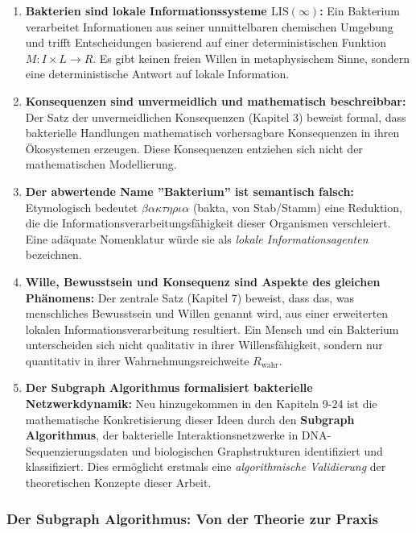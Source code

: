 \documentclass[a4paper,12pt]{article}
\theoremstyle{definition}
\begin{document}
\begin{enumerate}
    \item \textbf{Bakterien sind lokale Informationssysteme $\text{LIS}(\infty)$:}
    Ein Bakterium verarbeitet Informationen aus seiner unmittelbaren chemischen Umgebung und trifft Entscheidungen basierend auf einer deterministischen Funktion $M: I \times L \to R$. Es gibt keinen freien Willen in metaphysischem Sinne, sondern eine deterministische Antwort auf lokale Information.
    
    \item \textbf{Konsequenzen sind unvermeidlich und mathematisch beschreibbar:}
    Der Satz der unvermeidlichen Konsequenzen (Kapitel 3) beweist formal, dass bakterielle Handlungen mathematisch vorhersagbare Konsequenzen in ihren Ökosystemen erzeugen. Diese Konsequenzen entziehen sich nicht der mathematischen Modellierung.
    
    \item \textbf{Der abwertende Name ''Bakterium'' ist semantisch falsch:}
    Etymologisch bedeutet $\beta\alpha\kappa\tau\eta\rho\iota\alpha$ (bakta, von Stab/Stamm) eine Reduktion, die die Informationsverarbeitungsfähigkeit dieser Organismen verschleiert. Eine adäquate Nomenklatur würde sie als \textit{lokale Informationsagenten} bezeichnen.
    
    \item \textbf{Wille, Bewusstsein und Konsequenz sind Aspekte des gleichen Phänomens:}
    Der zentrale Satz (Kapitel 7) beweist, dass das, was menschliches Bewusstsein und Willen genannt wird, aus einer erweiterten lokalen Informationsverarbeitung resultiert. Ein Mensch und ein Bakterium unterscheiden sich nicht qualitativ in ihrer Willensfähigkeit, sondern nur quantitativ in ihrer Wahrnehmungsreichweite $R_{\text{wahr}}$.
    
    \item \textbf{Der Subgraph Algorithmus formalisiert bakterielle Netzwerkdynamik:}
    Neu hinzugekommen in den Kapiteln 9-24 ist die mathematische Konkretisierung dieser Ideen durch den \textbf{Subgraph Algorithmus}, der bakterielle Interaktionsnetzwerke in DNA-Sequenzierungsdaten und biologischen Graphstrukturen identifiziert und klassifiziert. Dies ermöglicht erstmals eine \textit{algorithmische Validierung} der theoretischen Konzepte dieser Arbeit.
\end{enumerate}

\subsubsection{Der Subgraph Algorithmus: Von der Theorie zur Praxis}
\end{document}
